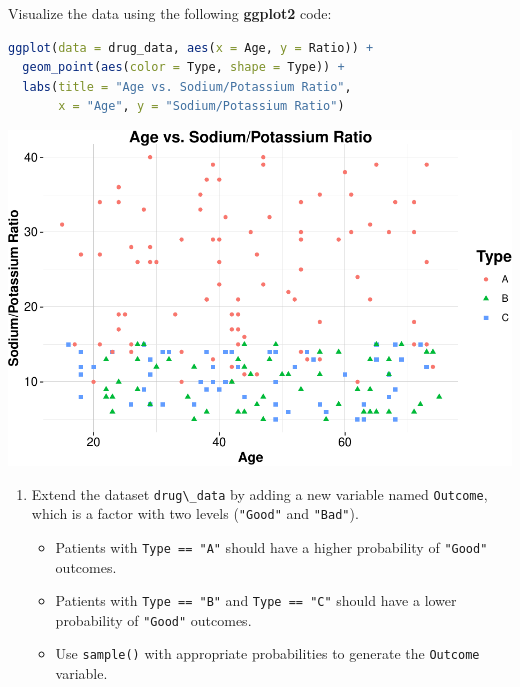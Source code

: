 \documentclass[
]{book}
\newcommand{\passthrough}[1]{#1}
\providecommand{\tightlist}{%
  \setlength{\itemsep}{0pt}\setlength{\parskip}{0pt}}
\theoremstyle{definition}
\theoremstyle{definition}
\theoremstyle{definition}
\theoremstyle{definition}
\theoremstyle{remark}
\begin{document}
Visualize the data using the following \textbf{ggplot2} code:

\begin{lstlisting}[language=R]
ggplot(data = drug_data, aes(x = Age, y = Ratio)) +
  geom_point(aes(color = Type, shape = Type)) + 
  labs(title = "Age vs. Sodium/Potassium Ratio", 
       x = "Age", y = "Sodium/Potassium Ratio")
\end{lstlisting}

\begin{center}\includegraphics{Intro-R_files/figure-latex/unnamed-chunk-48-1} \end{center}

\begin{enumerate}
\def\labelenumi{\arabic{enumi}.}
\setcounter{enumi}{21}
\tightlist
\item
  Extend the dataset \passthrough{\lstinline!drug\_data!} by adding a new variable named \passthrough{\lstinline!Outcome!}, which is a factor with two levels (\passthrough{\lstinline!"Good"!} and \passthrough{\lstinline!"Bad"!}).

  \begin{itemize}
  \tightlist
  \item
    Patients with \passthrough{\lstinline!Type == "A"!} should have a higher probability of \passthrough{\lstinline!"Good"!} outcomes.\\
  \item
    Patients with \passthrough{\lstinline!Type == "B"!} and \passthrough{\lstinline!Type == "C"!} should have a lower probability of \passthrough{\lstinline!"Good"!} outcomes.\\
  \item
    Use \passthrough{\lstinline!sample()!} with appropriate probabilities to generate the \passthrough{\lstinline!Outcome!} variable.
  \end{itemize}
\end{enumerate}
\end{document}
